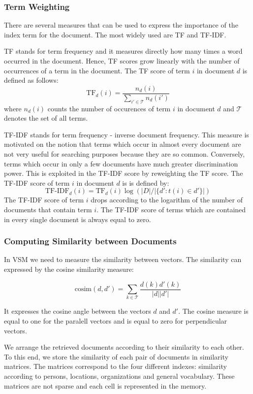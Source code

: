 \subsubsection{Term Weighting}
\label{sec:term_weighting}
There are several measures that can be used to express the importance of the index term for the document. The most widely used are TF and TF-IDF.

TF stands for term frequency and it measures directly how many times a word occurred in the document. Hence, TF scores grow linearly with the number of occurrences of a term in the document. The TF score of term $i$ in document $d$ is defined as follows:
\[\text{TF}_d(i) = \frac{n_d(i)}{\sum_{i' \in \mathcal{T}}{n_d(i')}}\]
where $n_d(i)$ counts the number of occurences of term $i$ in document $d$ and $\mathcal{T}$ denotes the set of all terms. 

TF-IDF stands for term frequency - inverse document frequency. This measure is motivated on the notion that terms which occur in almost every document are not very useful for searching purposes because they are so common. Conversely, terms which occur in only a few documents have much greater discrimination power. This is exploited in the TF-IDF score by reweighting the TF score. The TF-IDF score of term $i$ in document $d$ is is defined by:
\[\text{TF-IDF}_d(i)= \text{TF}_d(i)\log{(|D|/|\lbrace d' : t(i) \in d' \rbrace|)}\]
The TF-IDF score of term $i$ drops according to the logarithm of the number of documents that contain term $i$. The TF-IDF score of terms which are contained in every single document is always equal to zero.

\subsubsection{Computing Similarity between Documents}\label{sec:computing_similarity_between_documents}

In VSM we need to measure the similarity between vectors. The similarity can expressed by the cosine similarity measure:

\[\text{cosim}(d,d') = \sum_{k \in \mathcal{T}}\frac{d(k)d'(k)}{|d||d'|}\]

It expresses the cosine angle between the vectors $d$ and $d'$. The cosine measure is equal to one for the paralell vectors and is equal to zero for perpendicular vectors.

We arrange the retrieved documents according to their similarity to each other. To this end, we store the similarity of each pair of documents in similarity matrices. The matrices correspond to the four different indexes: similarity according to persons, locations, organizations and general vocabulary. These matrices are not sparse and each cell is represented in the memory.   

